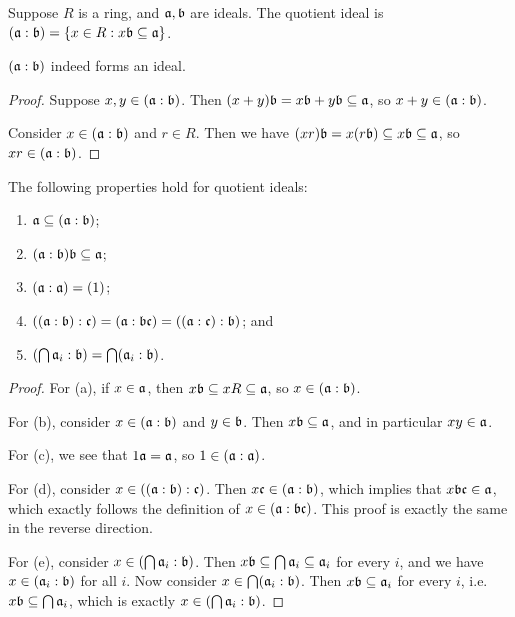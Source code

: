 \begin{definition}
    Suppose \(R\) is a ring, and \(\mathfrak{a,b}\) are ideals.
    The quotient ideal is \((\mathfrak{a:b}) = \{x \in R : x\mathfrak{b} \subseteq \mathfrak{a}\}\).
\end{definition}
\begin{lemma}
    \((\mathfrak{a:b})\) indeed forms an ideal.
\end{lemma}
\begin{proof}
    Suppose \(x,y \in (\mathfrak{a:b})\).
    Then \((x+y)\mathfrak{b} = x\mathfrak{b} + y\mathfrak{b} \subseteq \mathfrak{a}\),
    so \(x+y \in (\mathfrak{a:b})\).

    Consider \(x \in (\mathfrak{a:b})\) and \(r \in R\).
    Then we have \((xr)\mathfrak{b} = x(r\mathfrak{b}) \subseteq x\mathfrak{b} \subseteq \mathfrak{a}\),
    so \(xr \in (\mathfrak{a:b})\).
\end{proof}
\begin{proposition}\label{prop:quotient-ideal-properties}
    The following properties hold for quotient ideals:
    \begin{enumerate}[label={(\alph*)}, itemsep=0mm]
        \item \(\mathfrak{a} \subseteq (\mathfrak{a:b})\);
        \item \((\mathfrak{a:b})\mathfrak{b} \subseteq \mathfrak{a}\);
        \item \((\mathfrak{a:a}) = (1)\);
        \item \(\mathfrak{((a:b):c)} = \mathfrak{(a:bc)} = \mathfrak{((a:c):b)}\); and
        \item \(\pqty{\bigcap \mfk{a}_i:\mfk{b}} = \bigcap (\mfk{a}_i:\mfk{b})\).
    \end{enumerate}
\end{proposition}
\begin{proof}
    For (a), if \(x \in \mathfrak{a}\), then \(x\mathfrak{b} \subseteq xR \subseteq \mathfrak{a}\),
    so \(x \in (\mathfrak{a:b})\).

    For (b), consider \(x \in (\mathfrak{a:b})\) and \(y \in \mathfrak{b}\).
    Then \(x\mathfrak{b} \subseteq \mathfrak{a}\), and in particular \(xy \in \mathfrak{a}\).

    For (c), we see that \(1\mathfrak{a} = \mathfrak{a}\), so \(1 \in (\mathfrak{a:a})\).

    For (d), consider \(x \in \mathfrak{((a:b):c)}\).
    Then \(x\mathfrak{c} \in (\mathfrak{a:b})\),
    which implies that \(x\mathfrak{bc} \in \mathfrak{a}\),
    which exactly follows the definition of \(x \in (\mathfrak{a:bc})\).
    This proof is exactly the same in the reverse direction.

    For (e), consider \(x \in \pqty{\bigcap \mfk{a}_i:\mfk{b}}\).
    Then \(x\mathfrak{b} \subseteq \bigcap \mathfrak{a}_i \subseteq \mathfrak{a}_i\) for every \(i\),
    and we have \(x \in (\mathfrak{a}_i:\mathfrak{b})\) for all \(i\).
    Now consider \(x \in \bigcap (\mathfrak{a}_i:\mathfrak{b})\).
    Then \(x\mathfrak{b} \subseteq \mathfrak{a}_i\) for every \(i\),
    i.e.\ \(x\mathfrak{b} \subseteq \bigcap \mathfrak{a}_i\),
    which is exactly \(x \in (\bigcap \mathfrak{a}_i:\mathfrak{b})\).
\end{proof}

